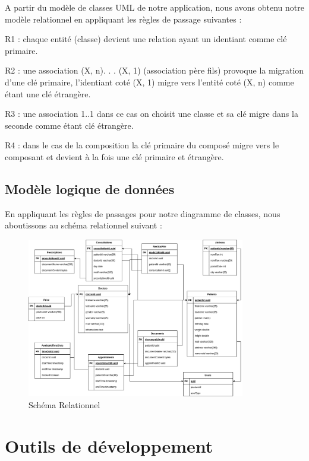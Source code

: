 \documentclass[a4paper]{report}
\begin{document}
A partir du modèle de classes UML de notre application, nous avons obtenu notre modèle
relationnel en appliquant les règles de passage suivantes :

R1 : chaque entité (classe) devient une relation ayant un identiant comme clé primaire.

R2 : une association (X, n). . . (X, 1) (association père fils) provoque la migration d'une
clé primaire, l'identiant coté (X, 1) migre vers l'entité coté (X, n) comme étant une clé
étrangère.

R3 : une association 1..1 dans ce cas on choisit une classe et sa clé migre dans la seconde
comme étant clé étrangère.

R4 : dans le cas de la composition la clé primaire du composé migre vers le composant
et devient à la fois une clé primaire et étrangère.


\subsection{Modèle logique de données}
En appliquant les règles de passages pour notre diagramme de classes, nous
aboutissons au schéma relationnel suivant :
\begin{figure}[H]
    \vspace{-10pt}
    \centering
    \includegraphics[width=0.85\textwidth]{besoins/modele_relationnel.png}
    \caption{Schéma Relationnel}
    \label{fig:SR}
\end{figure}

\section{Outils de développement}
\end{document}
